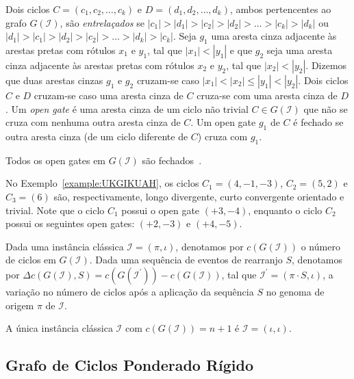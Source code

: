 Dois ciclos $C = (c_1, c_2, \ldots, c_k)$ e $D = (d_1, d_2, \ldots, d_k)$, ambos pertencentes ao grafo $G(\mathcal{I})$, são \emph{entrelaçados} se $|c_1| > |d_1| > |c_2|  > |d_2| > \ldots > |c_k| > |d_k|$ ou $|d_1| > |c_1| > |d_2|  > |c_2| > \ldots > |d_k| > |c_k|$. Seja $g_1$ uma aresta cinza adjacente às arestas pretas com rótulos $x_1$ e $y_1$, tal que $|x_1| < |y_1|$ e que $g_2$ seja uma aresta cinza adjacente às arestas pretas com rótulos $x_2$ e $y_2$, tal que $|x_2| < |y_2|$. Dizemos que duas arestas cinzas $g_1$ e $g_2$ cruzam-se caso $|x_1| < |x_2| \le |y_1| < |y_2|$. Dois ciclos $C$ e $D$ cruzam-se caso uma aresta cinza de $C$ cruza-se com uma aresta cinza de $D$. Um \emph{open gate} é uma aresta cinza de um ciclo não trivial $C \in G(\mathcal{I})$ que não se cruza com nenhuma outra aresta cinza de $C$. Um open gate $g_1$ de $C$ é fechado se outra aresta cinza (de um ciclo diferente de $C$) cruza com $g_1$.

\begin{remark}\label{remark:JBJWNCKF}
Todos os open gates em $G(\mathcal{I})$ são fechados~\cite{1996-bafna-pevzner}.
\end{remark}

No Exemplo~\ref{example:UKGIKUAH}, os ciclos $C_1=(4,-1,-3)$, $C_2 = (5,2)$ e $C_3 = (6)$ são, respectivamente, longo divergente, curto convergente orientado e trivial. Note que o ciclo $C_1$ possui o open gate $({+3},{-4})$, enquanto o ciclo $C_2$ possui os seguintes open gates: $({+2},{-3})$ e $({+4},{-5})$.

Dada uma instância clássica $\mathcal{I} = (\pi,\iota)$, denotamos por $c(G(\mathcal{I}))$ o número de ciclos em $G(\mathcal{I})$. Dada uma sequência de eventos de rearranjo $S$, denotamos por $\Delta c(G(\mathcal{I}), S) = c(G(\mathcal{I^{\prime}})) - c(G(\mathcal{I}))$, tal que $\mathcal{I^{\prime}} = (\pi \cdot S,\iota)$, a variação no número de ciclos após a aplicação da sequência $S$ no genoma de origem $\pi$ de $\mathcal{I}$.

\begin{remark}\label{remark:OYRVGHTB}
  A única instância clássica $\mathcal{I}$ com $c(G(\mathcal{I})) = n + 1$ é $\mathcal{I} = (\iota,\iota)$.
\end{remark}

\subsection{Grafo de Ciclos Ponderado Rígido}

